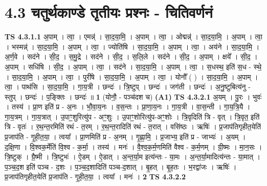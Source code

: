 \documentclass[17pt]{extarticle}
\begin{document}
\section*{ 4.3      चतुर्थकाण्डे तृतीयः प्रश्नः - चितिवर्णनं }
                                \textbf{ TS 4.3.1.1} \newline
                  अ॒पाम् । त्वा॒ । एमन्न्॑ । सा॒द॒या॒मि॒ । अ॒पाम् । त्वा॒ । ओद्मन्न्॑ । सा॒द॒या॒मि॒ । अ॒पाम् । त्वा॒ । भस्मन्न्॑ । सा॒द॒या॒मि॒ । अ॒पाम् । त्वा॒ । ज्योति॑षि । सा॒द॒या॒मि॒ । अ॒पाम् । त्वा॒ । अय॑ने । सा॒द॒या॒मि॒ । अ॒र्ण॒वे । सद॑ने । सी॒द॒ । स॒मु॒द्रे । सद॑ने । सी॒द॒ । स॒लि॒ले । सद॑ने । सी॒द॒ । अ॒पाम् । क्षये᳚ । सी॒द॒ । अ॒पाम् । सधि॑षि । सी॒द॒ । अ॒पाम् । त्वा॒ । सद॑ने । सा॒द॒या॒मि॒ । अ॒पाम् । त्वा॒ । स॒धस्थ॒ इति॑ स॒ध - स्थे॒ । सा॒द॒या॒मि॒ । अ॒पाम् । त्वा॒ । पुरी॑षे । सा॒द॒या॒मि॒ । अ॒पाम् । त्वा॒ । योनौ᳚ ( ) । सा॒द॒या॒मि॒ । अ॒पाम् । त्वा॒ । पाथ॑सि । सा॒द॒या॒मि॒ । गा॒य॒त्री । छन्दः॑ । त्रि॒ष्टुप् । छन्दः॑ । जग॑ती । छन्दः॑ । अ॒नु॒ष्टुबित्य॑नु - स्तुप् । छन्दः॑ । प॒ङ्क्तिः । छन्दः॑ ॥ \textbf{  1 } \newline
                  \newline
                      (योनौ॒ - पञ्च॑दश च)  \textbf{(A1)} \newline \newline
                                \textbf{ TS 4.3.2.1} \newline
                  अ॒यम् । पु॒रः । भुवः॑ । तस्य॑ । प्रा॒ण इति॑ प्र - अ॒नः । भौ॒वा॒य॒नः । व॒स॒न्तः । प्रा॒णा॒य॒नः । गा॒य॒त्री । वा॒स॒न्ती । गा॒य॒त्रि॒यै । गा॒य॒त्रम् । गा॒य॒त्रात् । उ॒पाꣳ॒॒शुरित्यु॑प - अꣳ॒॒शुः । उ॒पाꣳ॒॒शोरित्यु॑प-अꣳ॒॒शोः । त्रि॒वृदिति॑ त्रि - वृत् । त्रि॒वृत॒ इति॑ त्रि - वृतः॑ । र॒थ॒न्त॒रमिति॑ रथं - त॒रम् । र॒थ॒न्त॒रादिति॑ रथं - त॒रात् । वसि॑ष्ठः । ऋषिः॑ । प्र॒जाप॑तिगृहीत॒येति॑ प्र॒जाप॑ति - गृ॒ही॒त॒या॒ । त्वया᳚ । प्रा॒णमिति॑ प्र - अ॒नम् । गृ॒ह्णा॒मि॒ । प्र॒जाभ्य॒ इति॑ प्र - जाभ्यः॑ । अ॒यम् । द॒क्षि॒णा । वि॒श्वक॒र्मेति॑ वि॒श्व - क॒र्मा॒ । तस्य॑ । मनः॑ । वै॒श्व॒क॒र्म॒णमिति॑ वैश्व - क॒र्म॒णम् । ग्री॒ष्मः । मा॒न॒सः । त्रि॒ष्टुक् । ग्रै॒ष्मी । त्रि॒ष्टुभः॑ । ऐ॒डम् । ऐ॒डात् । अ॒न्त॒र्या॒म इत्य॑न्तः - या॒मः । अ॒न्त॒र्या॒मादित्य॑न्तः - या॒मात् । प॒ञ्च॒द॒श इति॑ पञ्च - द॒शः । प॒ञ्च॒द॒शादिति॑ पञ्च-द॒शात् । बृ॒हत् । बृ॒ह॒तः । भ॒रद्वा॑जः । ऋषिः॑ । प्र॒जाप॑तिगृहीत॒येति॑ प्र॒जाप॑ति - गृ॒ही॒त॒या॒ । त्वया᳚ । मनः॑ । \textbf{  2} \newline
                  \newline
                                \textbf{ TS 4.3.2.2} \newline
\end{document}
